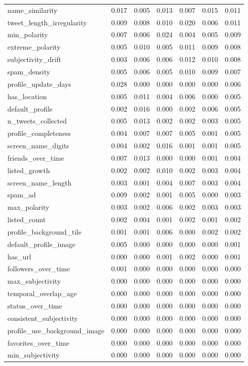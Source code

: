 \begin{tabular}{lrrrrrr}
name_similarity & 0.017 & 0.005 & 0.013 & 0.007 & 0.015 & 0.011 \\
tweet_length_irregularity & 0.009 & 0.008 & 0.010 & 0.020 & 0.006 & 0.011 \\
min_polarity & 0.007 & 0.006 & 0.024 & 0.004 & 0.005 & 0.009 \\
extreme_polarity & 0.005 & 0.010 & 0.005 & 0.011 & 0.009 & 0.008 \\
subjectivity_drift & 0.003 & 0.006 & 0.006 & 0.012 & 0.010 & 0.008 \\
spam_density & 0.005 & 0.006 & 0.005 & 0.010 & 0.009 & 0.007 \\
profile_update_days & 0.028 & 0.000 & 0.000 & 0.000 & 0.000 & 0.006 \\
has_location & 0.005 & 0.011 & 0.004 & 0.006 & 0.000 & 0.005 \\
default_profile & 0.002 & 0.016 & 0.000 & 0.002 & 0.006 & 0.005 \\
n_tweets_collected & 0.005 & 0.013 & 0.002 & 0.002 & 0.003 & 0.005 \\
profile_completeness & 0.004 & 0.007 & 0.007 & 0.005 & 0.001 & 0.005 \\
screen_name_digits & 0.004 & 0.002 & 0.016 & 0.001 & 0.001 & 0.005 \\
friends_over_time & 0.007 & 0.013 & 0.000 & 0.000 & 0.001 & 0.004 \\
listed_growth & 0.002 & 0.002 & 0.010 & 0.002 & 0.003 & 0.004 \\
screen_name_length & 0.003 & 0.001 & 0.004 & 0.007 & 0.003 & 0.004 \\
spam_ad & 0.009 & 0.002 & 0.001 & 0.005 & 0.000 & 0.003 \\
max_polarity & 0.003 & 0.002 & 0.006 & 0.002 & 0.003 & 0.003 \\
listed_count & 0.002 & 0.004 & 0.001 & 0.002 & 0.001 & 0.002 \\
profile_background_tile & 0.001 & 0.001 & 0.006 & 0.000 & 0.002 & 0.002 \\
default_profile_image & 0.005 & 0.000 & 0.000 & 0.000 & 0.000 & 0.001 \\
has_url & 0.000 & 0.000 & 0.001 & 0.002 & 0.000 & 0.001 \\
followers_over_time & 0.001 & 0.000 & 0.000 & 0.000 & 0.000 & 0.000 \\
max_subjectivity & 0.000 & 0.000 & 0.000 & 0.000 & 0.000 & 0.000 \\
temporal_overlap_age & 0.000 & 0.000 & 0.000 & 0.000 & 0.000 & 0.000 \\
status_over_time & 0.000 & 0.000 & 0.000 & 0.000 & 0.000 & 0.000 \\
consistent_subjectivity & 0.000 & 0.000 & 0.000 & 0.000 & 0.000 & 0.000 \\
profile_use_background_image & 0.000 & 0.000 & 0.000 & 0.000 & 0.000 & 0.000 \\
favorites_over_time & 0.000 & 0.000 & 0.000 & 0.000 & 0.000 & 0.000 \\
min_subjectivity & 0.000 & 0.000 & 0.000 & 0.000 & 0.000 & 0.000 \\
\bottomrule
\end{tabular}
